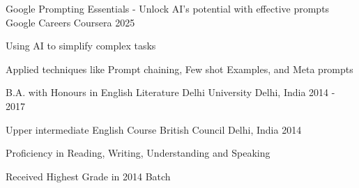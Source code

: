 

\begin{cventries}

  
  \cventry
    {Google Prompting Essentials - Unlock AI’s potential with effective prompts}
    {Google Careers}
    {Coursera}
    {2025}
    {
      \begin{cvitems}
        \item{Using AI to simplify complex tasks}
        \item{Applied techniques like Prompt chaining, Few shot Examples, and Meta prompts}
      \end{cvitems}
    }
  
  \cventry
    {B.A. with Honours in English Literature} %
    {Delhi University} %
    {Delhi, India} %
    {2014 - 2017} %
    {}
  
  \cventry
    {Upper intermediate English Course}
    {British Council}
    {Delhi, India}
    {2014}
    {
      \begin{cvitems}
        \item {Proficiency in Reading, Writing, Understanding and Speaking}
        \item {Received Highest Grade in 2014 Batch}
      \end{cvitems}
    }
\end{cventries}

